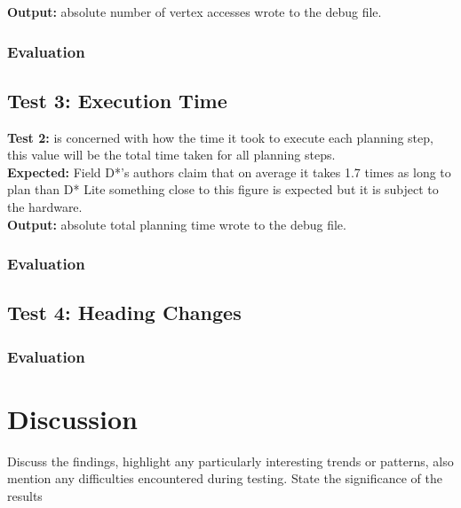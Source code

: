 \noindent
\textbf{Output:} absolute number of vertex accesses wrote to the debug file.

\subsubsection{Evaluation}

\newpage

\subsection{Test 3: Execution Time}

\noindent
\textbf{Test 2:} is concerned with how the time it took to execute each planning step, this value will be the total time taken for all planning steps.\\

\noindent
\textbf{Expected:} Field D*'s authors claim that on average it takes 1.7 times as long to plan than D* Lite something close to this figure is expected but it is subject to the hardware.\\

\noindent
\textbf{Output:} absolute total planning time wrote to the debug file.

\subsubsection{Evaluation}

\subsection{Test 4: Heading Changes}

\subsubsection{Evaluation}

\section{Discussion}
Discuss the findings, highlight any particularly interesting trends or patterns, also mention any difficulties encountered during testing. State the significance of the results